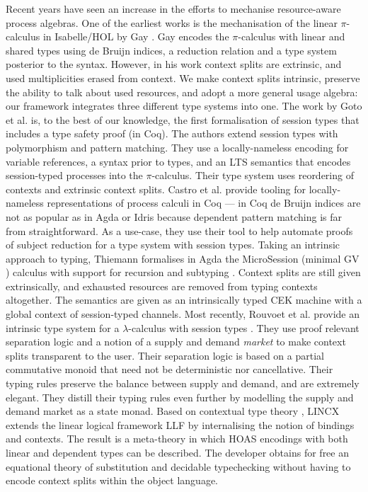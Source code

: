 \documentclass[a4paper,UKenglish,cleveref,autoref,thm-restate,authorcolumns]{lipics-v2019}
\theoremstyle{definition}
\newcommand{\lambdacalc}{$\lambda$-calculus}
\newcommand{\picalc}{$\pi$-calculus}
\begin{document}
Recent years have seen an increase in the efforts to mechanise resource-aware process algebras.
One of the earliest works is the mechanisation of the linear \picalc{} in Isabelle/HOL by Gay \cite{Gay2001}.
Gay encodes the \picalc{} with linear and shared types using de Bruijn indices, a reduction relation and a type system posterior to the syntax.
However, in his work context splits are extrinsic, and used multiplicities erased from context.
We make context splits intrinsic, preserve the ability to talk about used resources, and adopt a more general usage algebra: our framework integrates three different type systems into one.
%
The work by Goto et al. \cite{Goto2016a} is, to the best of our knowledge, the first formalisation of session types that includes a type safety proof (in Coq). 
The authors extend session types with polymorphism and pattern matching.
They use a locally-nameless encoding for variable references, a syntax prior to types, and an LTS semantics that encodes session-typed processes into the \picalc{}.
Their type system uses reordering of contexts and extrinsic context splits. 
%
Castro et al. \cite{Castro2020} provide tooling for locally-nameless representations of process calculi in Coq  --- in Coq de Bruijn indices are not as popular as in Agda or Idris because dependent pattern matching is far from straightforward.
As a use-case, they use their tool to help automate proofs of subject reduction for a type system with session types.
%
Taking an intrinsic approach to typing, Thiemann formalises in Agda the MicroSession (minimal GV \cite{Gay2010}) calculus with support for recursion and subtyping \cite{Thiemann2019}.
Context splits are still given extrinsically, and exhausted resources are removed from typing contexts altogether.
The semantics are given as an intrinsically typed CEK machine with a global context of session-typed channels.
%
Most recently, Rouvoet et al. provide an intrinsic type system for a \lambdacalc{} with session types \cite{Rouvoet2020}.
They use proof relevant separation logic and a notion of a supply and demand \emph{market} to make context splits transparent to the user.
Their separation logic is based on a partial commutative monoid that need not be deterministic nor cancellative.
Their typing rules preserve the balance between supply and demand, and are extremely elegant.
They distill their typing rules even further by modelling the supply and demand market as a state monad.
%
Based on contextual type theory \cite{Pientkaa, Pientka}, LINCX \cite{Georges2017} extends the linear logical framework LLF \cite{Cervesato1996} by internalising the notion of bindings and contexts.
The result is a meta-theory in which HOAS encodings with both linear and dependent types can be described.
The developer obtains for free an equational theory of substitution and decidable typechecking without having to encode context splits within the object language.
\end{document}
